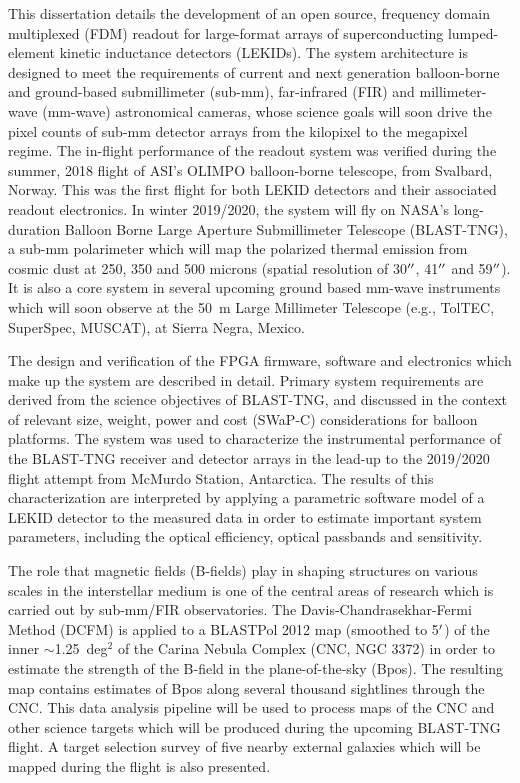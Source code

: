 This dissertation details the development of an open source, frequency domain multiplexed (FDM) readout for large-format arrays of superconducting lumped-element kinetic inductance detectors (LEKIDs). The system architecture is designed to meet the requirements of current and next generation balloon-borne and ground-based submillimeter (sub-mm), far-infrared (FIR) and millimeter-wave (mm-wave) astronomical cameras, whose science goals will soon drive the pixel counts of sub-mm detector arrays from the kilopixel to the megapixel regime. The in-flight performance of the readout system was verified during the summer, 2018 flight of ASI's OLIMPO balloon-borne telescope, from Svalbard, Norway. This was the first flight for both LEKID detectors and their associated readout electronics. In winter 2019/2020, the system will fly on NASA's long-duration Balloon Borne Large Aperture Submillimeter Telescope (BLAST-TNG), a sub-mm polarimeter which will map the polarized thermal emission from cosmic dust at 250, 350 and 500 microns (spatial resolution of 30$\operatorname{^{\prime\prime}}$, 41$\operatorname{^{\prime\prime}}$ and 59$\operatorname{^{\prime\prime}}$). It is also a core system in several upcoming ground based mm-wave instruments which will soon observe at the 50~m Large Millimeter Telescope (e.g., TolTEC, SuperSpec, MUSCAT), at Sierra Negra, Mexico.

The design and verification of the FPGA firmware, software and electronics which make up the system are described in detail. Primary system requirements are derived from the science objectives of BLAST-TNG, and discussed in the context of relevant size, weight, power and cost (SWaP-C) considerations for balloon platforms. The system was used to characterize the instrumental performance of the BLAST-TNG receiver and detector arrays in the lead-up to the 2019/2020 flight attempt from McMurdo Station, Antarctica. The results of this characterization are interpreted by applying a parametric software model of a LEKID detector to the measured data in order to estimate important system parameters, including the optical efficiency, optical passbands and sensitivity.

The role that magnetic fields (B-fields) play in shaping structures on various scales in the interstellar medium is one of the central areas of research which is carried out by sub-mm/FIR observatories. The Davis-Chandrasekhar-Fermi Method (DCFM) is applied to a BLASTPol 2012 map (smoothed to 5$\operatorname{^{\prime}}$) of the inner $\sim$1.25~deg$^{2}$ of the Carina Nebula Complex (CNC, NGC 3372) in order to estimate the strength of the B-field in the plane-of-the-sky (\gls{Bpos}). The resulting map contains estimates of \gls{Bpos} along several thousand sightlines through the CNC\@. This data analysis pipeline will be used to process maps of the CNC and other science targets which will be produced during the upcoming BLAST-TNG flight. A target selection survey of five nearby external galaxies which will be mapped during the flight is also presented.


